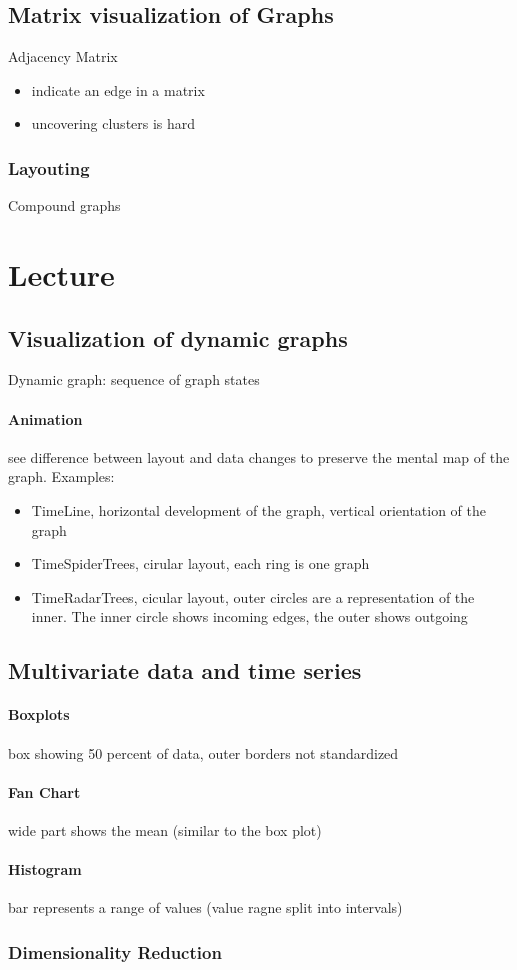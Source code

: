 \documentclass[ngerman]{scrartcl}
\begin{document}
\subsection{Matrix visualization of Graphs}
Adjacency Matrix
\begin{itemize}
  \item indicate an edge in a matrix
  \item uncovering clusters is hard
\end{itemize}
\subsubsection*{Layouting}
Compound graphs

\section{Lecture}
\subsection{Visualization of dynamic graphs}
Dynamic graph: sequence of graph states
\paragraph{Animation} see difference between layout and data changes to preserve the mental map of the graph. Examples:
\begin{itemize}
  \item TimeLine, horizontal development of the graph, vertical orientation of the graph  
  \item TimeSpiderTrees, cirular layout, each ring is one graph
  \item TimeRadarTrees, cicular layout, outer circles are a representation of the inner. The inner circle shows incoming edges, the outer shows outgoing
\end{itemize}

\subsection{Multivariate data and time series}
\paragraph{Boxplots} box showing 50 percent of data, outer borders not standardized
\paragraph{Fan Chart} wide part shows the mean (similar to the box plot) 
\paragraph{Histogram} bar represents a range of values (value ragne split into intervals)
\subsubsection{Dimensionality Reduction}
\paragraph{}
\end{document}
